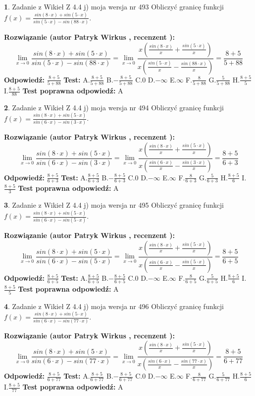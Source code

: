 \documentclass[12pt, a4paper]{article}
\theoremstyle{definition} %
\newtheorem{zad}{}
\newcommand{\zadStart}[1]{\begin{zad}#1\newline}
\newcommand{\zadStop}{\end{zad}}
\newcommand{\rozwStart}[2]{\noindent \textbf{Rozwiązanie (autor #1 , recenzent #2): }\newline}
\newcommand{\rozwStop}{\newline}
\newcommand{\odpStart}{\noindent \textbf{Odpowiedź:}\newline}
\newcommand{\odpStop}{\newline}
\newcommand{\testStart}{\noindent \textbf{Test:}\newline}
\newcommand{\testStop}{\newline}
\newcommand{\kluczStart}{\noindent \textbf{Test poprawna odpowiedź:}\newline}
\newcommand{\kluczStop}{\newline}
\begin{document}
\zadStart{Zadanie z Wikieł Z 4.4 j) moja wersja nr 493}
Obliczyć granicę funkcji $f(x)=\frac{sin(8\cdot x) +sin(5\cdot x)}{sin(5\cdot x) -sin(88\cdot x)}$.
\zadStop
\rozwStart{Patryk Wirkus}{}
$$\lim\limits_{x\to 0}\frac{sin(8\cdot x) +sin(5\cdot x)}{sin(5\cdot x) -sin(88\cdot x)}=\lim\limits_{x\to 0}\frac{x(\frac{sin(8\cdot x)}{x}+\frac{sin(5\cdot x)}{x})}{x(\frac{sin(5\cdot x)}{x}-\frac{sin(88\cdot x)}{x})}=\frac{8+5}{5+88}$$
\rozwStop
\odpStart
$\frac{8+5}{5+88}$
\odpStop
\testStart
A.$\frac{8+5}{5+88}$
B.$-\frac{8+5}{5+88}$
C.$0$
D.$-\infty$
E.$\infty$
F.$\frac{8}{5+88}$
G.$\frac{5}{5+88}$
H.$\frac{8+5}{5}$
I.$\frac{8+5}{88}$
\testStop
\kluczStart
A
\kluczStop



\zadStart{Zadanie z Wikieł Z 4.4 j) moja wersja nr 494}
Obliczyć granicę funkcji $f(x)=\frac{sin(8\cdot x) +sin(5\cdot x)}{sin(6\cdot x) -sin(3\cdot x)}$.
\zadStop
\rozwStart{Patryk Wirkus}{}
$$\lim\limits_{x\to 0}\frac{sin(8\cdot x) +sin(5\cdot x)}{sin(6\cdot x) -sin(3\cdot x)}=\lim\limits_{x\to 0}\frac{x(\frac{sin(8\cdot x)}{x}+\frac{sin(5\cdot x)}{x})}{x(\frac{sin(6\cdot x)}{x}-\frac{sin(3\cdot x)}{x})}=\frac{8+5}{6+3}$$
\rozwStop
\odpStart
$\frac{8+5}{6+3}$
\odpStop
\testStart
A.$\frac{8+5}{6+3}$
B.$-\frac{8+5}{6+3}$
C.$0$
D.$-\infty$
E.$\infty$
F.$\frac{8}{6+3}$
G.$\frac{5}{6+3}$
H.$\frac{8+5}{6}$
I.$\frac{8+5}{3}$
\testStop
\kluczStart
A
\kluczStop



\zadStart{Zadanie z Wikieł Z 4.4 j) moja wersja nr 495}
Obliczyć granicę funkcji $f(x)=\frac{sin(8\cdot x) +sin(5\cdot x)}{sin(6\cdot x) -sin(5\cdot x)}$.
\zadStop
\rozwStart{Patryk Wirkus}{}
$$\lim\limits_{x\to 0}\frac{sin(8\cdot x) +sin(5\cdot x)}{sin(6\cdot x) -sin(5\cdot x)}=\lim\limits_{x\to 0}\frac{x(\frac{sin(8\cdot x)}{x}+\frac{sin(5\cdot x)}{x})}{x(\frac{sin(6\cdot x)}{x}-\frac{sin(5\cdot x)}{x})}=\frac{8+5}{6+5}$$
\rozwStop
\odpStart
$\frac{8+5}{6+5}$
\odpStop
\testStart
A.$\frac{8+5}{6+5}$
B.$-\frac{8+5}{6+5}$
C.$0$
D.$-\infty$
E.$\infty$
F.$\frac{8}{6+5}$
G.$\frac{5}{6+5}$
H.$\frac{8+5}{6}$
I.$\frac{8+5}{5}$
\testStop
\kluczStart
A
\kluczStop



\zadStart{Zadanie z Wikieł Z 4.4 j) moja wersja nr 496}
Obliczyć granicę funkcji $f(x)=\frac{sin(8\cdot x) +sin(5\cdot x)}{sin(6\cdot x) -sin(77\cdot x)}$.
\zadStop
\rozwStart{Patryk Wirkus}{}
$$\lim\limits_{x\to 0}\frac{sin(8\cdot x) +sin(5\cdot x)}{sin(6\cdot x) -sin(77\cdot x)}=\lim\limits_{x\to 0}\frac{x(\frac{sin(8\cdot x)}{x}+\frac{sin(5\cdot x)}{x})}{x(\frac{sin(6\cdot x)}{x}-\frac{sin(77\cdot x)}{x})}=\frac{8+5}{6+77}$$
\rozwStop
\odpStart
$\frac{8+5}{6+77}$
\odpStop
\testStart
A.$\frac{8+5}{6+77}$
B.$-\frac{8+5}{6+77}$
C.$0$
D.$-\infty$
E.$\infty$
F.$\frac{8}{6+77}$
G.$\frac{5}{6+77}$
H.$\frac{8+5}{6}$
I.$\frac{8+5}{77}$
\testStop
\kluczStart
A
\kluczStop
\end{document}
